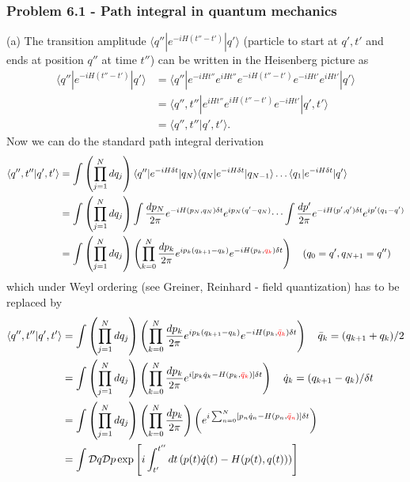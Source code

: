 \documentclass[10pt,a4paper]{article}
\theoremstyle{definition}
\begin{document}
\subsubsection{Problem 6.1 - Path integral in quantum mechanics}
(a) The transition amplitude $\langle q''|e^{-iH(t''-t')}|q'\rangle$ (particle to start at $q',t'$ and ends at position $q''$ at time $t''$) can be written in the Heisenberg picture as
\begin{align}
    \langle q''|e^{-iH(t''-t')}|q'\rangle
    &=\langle q''|e^{-iHt''}e^{iHt''}e^{-iH(t''-t')}e^{-iHt'}e^{iHt'}|q'\rangle\\
    &=\langle q'',t''|e^{iHt''}e^{iH(t''-t')}e^{-iHt'}|q',t'\rangle\\
    &=\langle q'',t''|q',t'\rangle.
\end{align}
Now we can do the standard path integral derivation
\begin{align}
    \langle q'',t''|q',t'\rangle
    &=\int\left(\prod_{j=1}^N dq_j\right) \langle q''|e^{-iH\delta t}|q_N\rangle \langle q_N|e^{-iH\delta t}|q_{N-1}\rangle \dots \langle q_1|e^{-iH\delta t}|q'\rangle\\
    &=\int\left(\prod_{j=1}^N dq_j\right) \int\frac{dp_N}{2\pi}e^{-iH(p_N,q_N)\delta t}e^{ip_N(q'-q_N)} \dots  \int\frac{dp'}{2\pi}e^{-iH(p',q')\delta t}e^{ip'(q_1-q')}\\
    &=\int\left(\prod_{j=1}^N dq_j\right)\left(\prod_{k=0}^{N}\frac{dp_k}{2\pi} e^{ip_k(q_{k+1}-q_k)}e^{-iH(p_k,\textcolor{red}{q_k})\delta t}\right)\quad(q_0=q',q_{N+1}=q'')
\end{align}
which under Weyl ordering (see Greiner, Reinhard - field quantization) has to be replaced by
\begin{align}
    \langle q'',t''|q',t'\rangle
    &=\int\left(\prod_{j=1}^N dq_j\right)\left(\prod_{k=0}^{N}\frac{dp_k}{2\pi} e^{ip_k(q_{k+1}-q_k)}e^{-iH(p_k,\textcolor{red}{\bar{q}_k})\delta t}\right)\quad \bar{q}_k=(q_{k+1}+q_k)/2\\
    &=\int\left(\prod_{j=1}^N dq_j\right)\left(\prod_{k=0}^{N}\frac{dp_k}{2\pi} e^{i[p_k\dot{q}_k-H(p_k,\textcolor{red}{\bar{q}_k})]\delta t}\right)\quad \dot{q}_k=(q_{k+1}-q_k)/{\delta t}\\
    &=\int\left(\prod_{j=1}^N dq_j\right)\left(\prod_{k=0}^{N}\frac{dp_k}{2\pi}\right) \left(e^{i\sum_{n=0}^N[p_n\dot{q}_n-H(p_n,\textcolor{red}{\bar{q}_n})]\delta t}\right)\\
    &=\int\mathcal{D}q\mathcal{D}p\exp\left[i\int_{t'}^{t''}dt\left(p(t)\dot{q}(t)-H(p(t),q(t))\right)\right]
\end{align}
\end{document}

